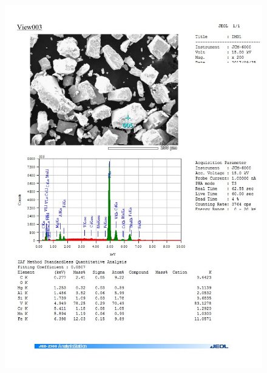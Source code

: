 \documentclass[12pt]{article}
\begin{document}
\begin{figure}[H]
	\includegraphics[width = \linewidth]{./pictures/dot_spec_5.jpg}
\end{figure}
\end{document}
